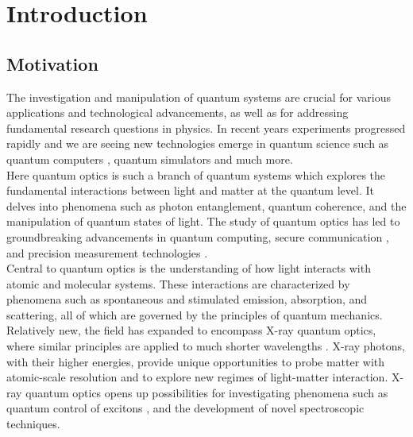 \chapter{Introduction}

\section{Motivation}
The investigation and manipulation of quantum systems are crucial for various applications and technological advancements, as well as for addressing fundamental research questions in physics. In recent years experiments progressed rapidly and we are seeing new technologies emerge in quantum science \cite{QS_1,QS_2} such as quantum computers \cite{quantumcomp1, quantumcomp2}, quantum simulators \cite{quantumsimulators1} and much more.\\

Here quantum optics is such a branch of quantum systems which explores the fundamental interactions between light and matter at the quantum level. It delves into phenomena such as photon entanglement, quantum coherence, and the manipulation of quantum states of light. The study of quantum optics has led to groundbreaking advancements in quantum computing, secure communication \cite{quantuminformation}, and precision measurement technologies \cite{Heeg2017}.\\

Central to quantum optics is the understanding of how light interacts with atomic and molecular systems. These interactions are characterized by phenomena such as spontaneous and stimulated emission, absorption, and scattering, all of which are governed by the principles of quantum mechanics. Relatively new, the field has expanded to encompass X-ray quantum optics, where similar principles are applied to much shorter wavelengths \cite{scientific_opp_XFEL}. X-ray photons, with their higher energies, provide unique opportunities to probe matter with atomic-scale resolution and to explore new regimes of light-matter interaction. X-ray quantum optics opens up possibilities for investigating phenomena such as quantum control of excitons \cite{Heeg2021}, and the development of novel spectroscopic techniques.\\

